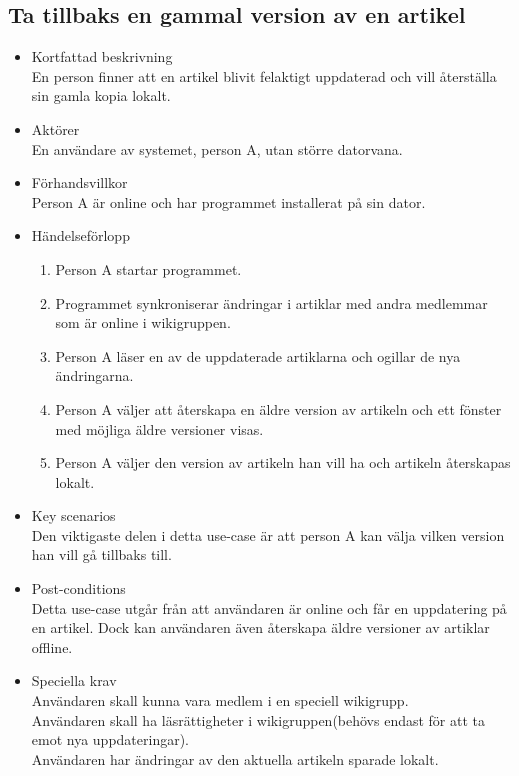 \subsection{Ta tillbaks en gammal version av en artikel}
\begin{itemize}
	\item Kortfattad beskrivning
	\\En person finner att en artikel blivit felaktigt uppdaterad och vill återställa sin gamla kopia lokalt.
	\item Aktörer
	\\En användare av systemet, person A, utan större datorvana.
	\item Förhandsvillkor
	\\Person A är online och har programmet installerat på sin dator.
	\item Händelseförlopp
	\begin{enumerate}
		\item Person A startar programmet.
		\item Programmet synkroniserar ändringar i artiklar med andra medlemmar som är online i wikigruppen.
		\item Person A läser en av de uppdaterade artiklarna och ogillar de nya ändringarna.
		\item Person A väljer att återskapa en äldre version av artikeln och ett fönster med möjliga äldre versioner visas.
		\item Person A väljer den version av artikeln han vill ha och artikeln återskapas lokalt.
	\end{enumerate}	
	\item Key scenarios
	\\Den viktigaste delen i detta use-case är att person A kan välja vilken version han vill gå tillbaks till.
	\item Post-conditions
	\\Detta use-case utgår från att användaren är online och får en uppdatering på en artikel. Dock kan användaren även återskapa äldre versioner av artiklar offline.
	\item Speciella krav
	\\Användaren skall kunna vara medlem i en speciell wikigrupp.
	\\Användaren skall ha läsrättigheter i wikigruppen(behövs endast för att ta emot nya uppdateringar).
	\\Användaren har ändringar av den aktuella artikeln sparade lokalt.
\end{itemize}


